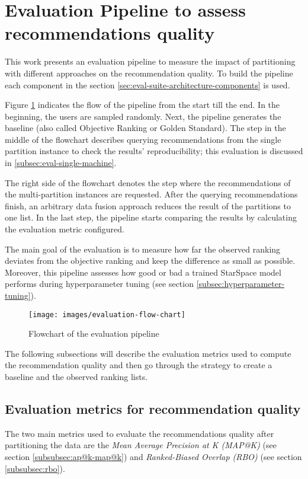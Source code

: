 \section{Evaluation Pipeline to assess recommendations quality}
\label{sec:evaluation-pipeline}
This work presents an evaluation pipeline to measure the impact of partitioning with different approaches on the recommendation quality. To build the pipeline each component in the section \ref{sec:eval-suite-architecture-components} is used. 

Figure \ref{fig:flowchart-evaluation-pipeline} indicates the flow of the pipeline from the start till the end. In the beginning, the users are sampled randomly. Next, the pipeline generates the baseline (also called Objective Ranking or Golden Standard). The step in the middle of the flowchart describes querying recommendations from the single partition instance to check the results' reproducibility; this evaluation is discussed in \ref{subsec:eval-single-machine}. 


The right side of the flowchart denotes the step where the recommendations of the multi-partition instances are requested. After the querying recommendations finish, an arbitrary data fusion approach reduces the result of the partitions to one list. In the last step, the pipeline starts comparing the results by calculating the evaluation metric configured. 

The main goal of the evaluation is to measure how far the observed ranking deviates from the objective ranking and keep the difference as small as possible. Moreover, this pipeline assesses how good or bad a trained StarSpace model performs during hyperparameter tuning (see section \ref{subsec:hyperparameter-tuning}).

\begin{figure}[!h]
    \centering
    \texttt{[image: images/evaluation-flow-chart]}
    \caption{Flowchart of the evaluation pipeline}
    \label{fig:flowchart-evaluation-pipeline}
\end{figure}

The following subsections will describe the evaluation metrics used to compute the recommendation quality and then go through the strategy to create a baseline and the observed ranking lists.

\subsection{Evaluation metrics for recommendation quality}
\label{subsec:evaluation-metrics-for-recommendation-quality}
The two main metrics used to evaluate the recommendations quality after partitioning the data are the \emph{Mean Average Precision at K (MAP@K)} (see section \ref{subsubsec:ap@k-map@k})  and \emph{Ranked-Biased Overlap (RBO)} (see section \ref{subsubsec:rbo}). 


